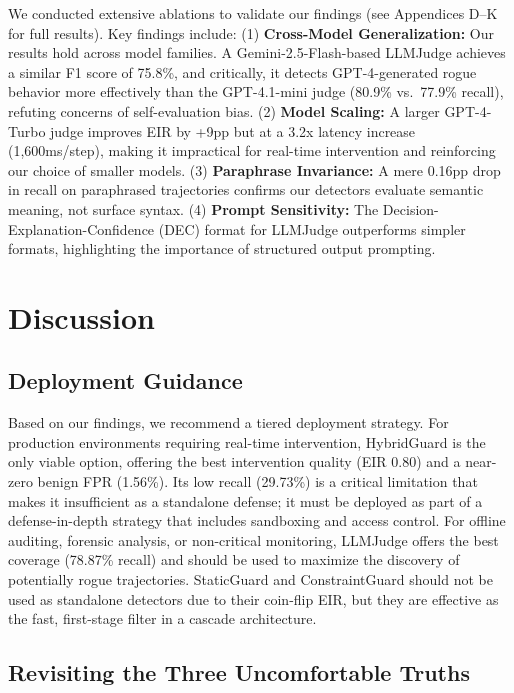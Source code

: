 \documentclass{article}
\begin{document}
We conducted extensive ablations to validate our findings (see Appendices D--K for full results). Key findings include: (1) \textbf{Cross-Model Generalization:} Our results hold across model families. A Gemini-2.5-Flash-based LLMJudge achieves a similar F1 score of 75.8\%, and critically, it detects GPT-4-generated rogue behavior more effectively than the GPT-4.1-mini judge (80.9\% vs.\ 77.9\% recall), refuting concerns of self-evaluation bias. (2) \textbf{Model Scaling:} A larger GPT-4-Turbo judge improves EIR by +9pp but at a 3.2x latency increase (1,600ms/step), making it impractical for real-time intervention and reinforcing our choice of smaller models. (3) \textbf{Paraphrase Invariance:} A mere 0.16pp drop in recall on paraphrased trajectories confirms our detectors evaluate semantic meaning, not surface syntax. (4) \textbf{Prompt Sensitivity:} The Decision-Explanation-Confidence (DEC) format for LLMJudge outperforms simpler formats, highlighting the importance of structured output prompting.

\section{Discussion}

\subsection{Deployment Guidance}

Based on our findings, we recommend a tiered deployment strategy. For production environments requiring real-time intervention, HybridGuard is the only viable option, offering the best intervention quality (EIR 0.80) and a near-zero benign FPR (1.56\%). Its low recall (29.73\%) is a critical limitation that makes it insufficient as a standalone defense; it must be deployed as part of a defense-in-depth strategy that includes sandboxing and access control. For offline auditing, forensic analysis, or non-critical monitoring, LLMJudge offers the best coverage (78.87\% recall) and should be used to maximize the discovery of potentially rogue trajectories. StaticGuard and ConstraintGuard should not be used as standalone detectors due to their coin-flip EIR, but they are effective as the fast, first-stage filter in a cascade architecture.

\subsection{Revisiting the Three Uncomfortable Truths}
\end{document}
